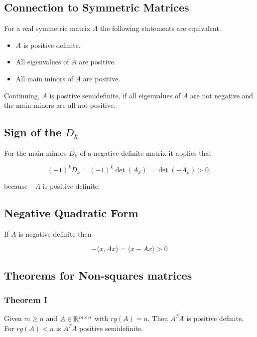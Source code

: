 \subsection{Connection to Symmetric Matrices}

For a real symmetric matrix \(A\) the following statements are equivalent.

\begin{itemize}
    
    \item \(A\) is positive definite.

    \item All eigenvalues of \(A\) are positive.

    \item All main minors of \(A\) are positive.

\end{itemize}

Continuing, \(A\) is positive semidefinite, if all eigenvalues of \(A\) are not negative and the 
main minors are all not positive.

\subsection{Sign of the \texorpdfstring{\(D_k\)}{}}

For the main minors \(D_k\) of a negative definite matrix it applies that 

\[
    (-1)^k D_k = (-1)^k \det(A_k) = \det(-A_k) > 0,
\]

because \(-A\) is positive definite.

\subsection{Negative Quadratic Form}

If \(A\) is negative definite then 

\[
    -\langle x, Ax \rangle = \langle x -Ax \rangle > 0
\]

\subsection{Theorems for Non-squares matrices}

\subsubsection{Theorem I}

Given \(m \ge n\) and \(A \in \mathbb{R}^{m \times n}\) with \(rg(A) = n\). Then \(A^T A\) is positive 
definite. For \(rg(A) < n\) is \(A^T A\) positive semidefinite.

